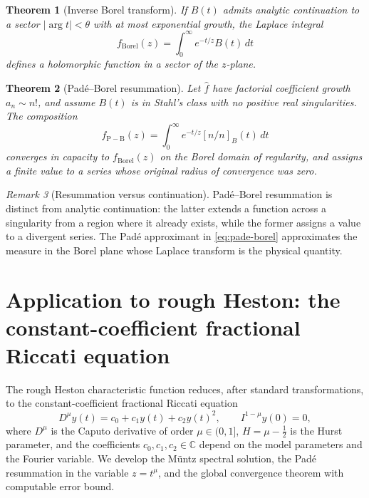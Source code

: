 \documentclass[11pt]{article}
\newtheorem{theorem}{Theorem}[section]
\theoremstyle{definition}
\theoremstyle{remark}
\newtheorem{remark}[theorem]{Remark}
\begin{document}
\begin{theorem}[Inverse Borel transform]
\label{thm:inverse-borel}
If $B(t)$ admits analytic continuation to a sector $|\arg t|<\theta$ with at most exponential growth, the Laplace integral
\begin{equation}
f_{\mathrm{Borel}}(z)=\int_{0}^{\infty}e^{-t/z}B(t)\,dt
\label{eq:inverse-borel}
\end{equation}
defines a holomorphic function in a sector of the $z$-plane.
\end{theorem}

\begin{theorem}[Pad\'e--Borel resummation]
\label{thm:pade-borel}
Let $\hat{f}$ have factorial coefficient growth $a_{n}\sim n!$, and assume $B(t)$ is in Stahl's class with no positive real singularities. The composition
\begin{equation}
f_{\mathrm{P-B}}(z)=
\int_{0}^{\infty}e^{-t/z}[n/n]_{B}(t)\,dt
\label{eq:pade-borel}
\end{equation}
converges in capacity to $f_{\mathrm{Borel}}(z)$ on the Borel domain of regularity, and assigns a finite value to a series whose original radius of convergence was zero.
\end{theorem}

\begin{remark}[Resummation versus continuation]
\label{rem:resummation}
Pad\'e--Borel resummation is distinct from analytic continuation: the latter extends a function across a singularity from a region where it already exists, while the former assigns a value to a divergent series. The Pad\'e approximant in \eqref{eq:pade-borel} approximates the measure in the Borel plane whose Laplace transform is the physical quantity.
\end{remark}

\section{Application to rough Heston: the constant-coefficient fractional Riccati equation}
\label{sec:heston}

The rough Heston characteristic function reduces, after standard transformations, to the constant-coefficient fractional Riccati equation
\begin{equation}
D^{\mu}y(t)=c_{0}+c_{1}y(t)+c_{2}y(t)^{2},
\qquad I^{1-\mu}y(0)=0,
\label{eq:fractional-riccati}
\end{equation}
where $D^{\mu}$ is the Caputo derivative of order $\mu\in(0,1]$, $H=\mu-\tfrac{1}{2}$ is the Hurst parameter, and the coefficients $c_{0},c_{1},c_{2}\in\mathbb{C}$ depend on the model parameters and the Fourier variable. We develop the M\"untz spectral solution, the Pad\'e resummation in the variable $z=t^{\mu}$, and the global convergence theorem with computable error bound.
\end{document}
